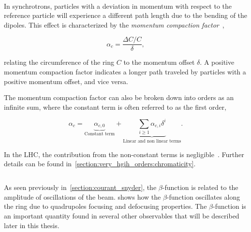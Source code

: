 \FloatBarrier

\paragraph{}
\label{subsection:coordinates_systems:momentum_compaction_factor}

In synchrotrons, particles with a deviation in momentum with respect to the reference particle will
experience a different path length due to the bending of the dipoles. This effect is characterized
by the \textit{momentum compaction factor}~\cite{wiedemann_particle_2015},

\begin{equation}
    \alpha_c = \frac{\Delta C / C}{\delta},
\end{equation}

relating the circumference of the ring $C$ to the momentum offset $\delta$.
A positive momentum compaction factor indicates a longer path traveled by particles with a positive
momentum offset, and vice versa.


The momentum compaction factor can also be broken down into orders as an infinite sum, where the
constant term is often referred to as the first order,

\begin{equation}
    \alpha_c = \underbrace{\alpha_{c,0}}_{\text{Constant term}}
               + \underbrace{\sum_{i \geq 1} \alpha_{c, i} \delta^i}_\text{Linear and non linear terms}.
\end{equation}

In the LHC, the contribution from the non-constant terms is
negligible~\cite{keintzel_jacqueline_beam_2022}. Further details can be found
in~\cref{section:very_hgih_orders:chromaticity}.

\FloatBarrier

\subsection{}

As seen previously in~\cref{section:courant_snyder}, the $\beta$-function is related to the amplitude
of oscillations of the beam.  shows how the $\beta$-function
oscillates along the ring due to quadrupoles focusing and defocusing properties.
The $\beta$-function is an important quantity found in several other observables that
will be described later in this thesis.


